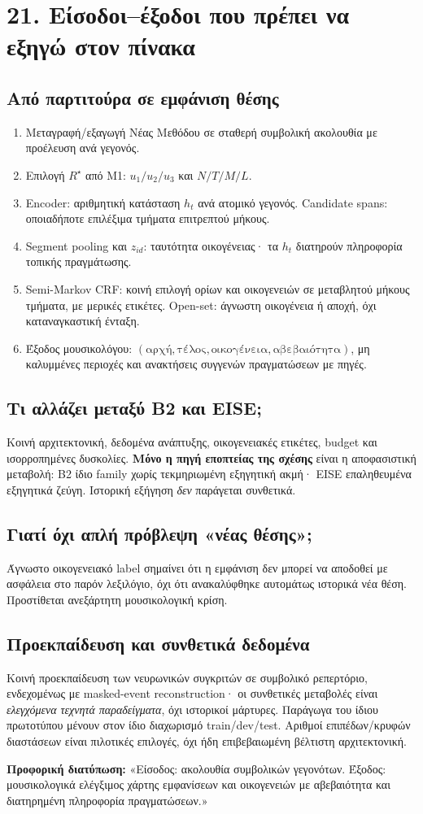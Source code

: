 \documentclass[9pt,a4paper]{extarticle}
\newcommand{\say}[1]{\begin{keybox}\textbf{Προφορική διατύπωση:} #1\end{keybox}}
\begin{document}
\section*{21. Είσοδοι--έξοδοι που πρέπει να εξηγώ στον πίνακα}
\subsection*{Από παρτιτούρα σε εμφάνιση θέσης}
\begin{enumerate}
\item Μεταγραφή/εξαγωγή Νέας Μεθόδου σε σταθερή συμβολική ακολουθία με προέλευση ανά γεγονός.
\item Επιλογή \(R^\star\) από M1: \(u_1/u_2/u_3\) και \(N/T/M/L\).
\item Encoder: αριθμητική κατάσταση \(h_t\) ανά ατομικό γεγονός. Candidate spans: οποιαδήποτε επιλέξιμα τμήματα επιτρεπτού μήκους.
\item Segment pooling και \(z_{id}\): ταυτότητα οικογένειας· τα \(h_t\) διατηρούν πληροφορία τοπικής πραγμάτωσης.
\item Semi-Markov CRF: κοινή επιλογή ορίων και οικογενειών σε μεταβλητού μήκους τμήματα, με μερικές ετικέτες. Open-set: άγνωστη οικογένεια ή αποχή, όχι καταναγκαστική ένταξη.
\item Έξοδος μουσικολόγου: \((\mathrm{αρχή},\mathrm{τέλος},\mathrm{οικογένεια},\mathrm{αβεβαιότητα})\), μη καλυμμένες περιοχές και ανακτήσεις συγγενών πραγματώσεων με πηγές.
\end{enumerate}
\subsection*{Τι αλλάζει μεταξύ B2 και EISE;}
Κοινή αρχιτεκτονική, δεδομένα ανάπτυξης, οικογενειακές ετικέτες, budget και ισορροπημένες δυσκολίες. \textbf{Μόνο η πηγή εποπτείας της σχέσης} είναι η αποφασιστική μεταβολή: B2 ίδιο family χωρίς τεκμηριωμένη εξηγητική ακμή· EISE επαληθευμένα εξηγητικά ζεύγη. Ιστορική εξήγηση \emph{δεν} παράγεται συνθετικά.
\subsection*{Γιατί όχι απλή πρόβλεψη «νέας θέσης»;}
Άγνωστο οικογενειακό label σημαίνει ότι η εμφάνιση δεν μπορεί να αποδοθεί με ασφάλεια στο παρόν λεξιλόγιο, όχι ότι ανακαλύφθηκε αυτομάτως ιστορικά νέα θέση. Προστίθεται ανεξάρτητη μουσικολογική κρίση.
\subsection*{Προεκπαίδευση και συνθετικά δεδομένα}
Κοινή προεκπαίδευση των νευρωνικών συγκριτών σε συμβολικό ρεπερτόριο, ενδεχομένως με masked-event reconstruction· οι συνθετικές μεταβολές είναι \emph{ελεγχόμενα τεχνητά παραδείγματα}, όχι ιστορικοί μάρτυρες. Παράγωγα του ίδιου πρωτοτύπου μένουν στον ίδιο διαχωρισμό train/dev/test. Αριθμοί επιπέδων/κρυφών διαστάσεων είναι πιλοτικές επιλογές, όχι ήδη επιβεβαιωμένη βέλτιστη αρχιτεκτονική.
\say{«Είσοδος: ακολουθία συμβολικών γεγονότων. Έξοδος: μουσικολογικά ελέγξιμος χάρτης εμφανίσεων και οικογενειών με αβεβαιότητα και διατηρημένη πληροφορία πραγματώσεων.»}
\end{document}
